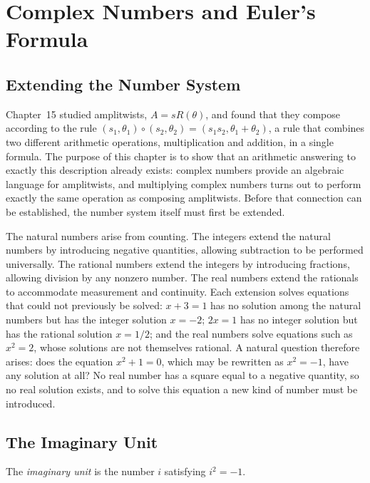 \chapter{Complex Numbers and Euler's Formula}
\label{ch:ch16-complex-euler}

\section{Extending the Number System}

Chapter~15 studied amplitwists, $A = sR(\theta)$, and found that they
compose according to the rule $(s_1,\theta_1)\circ(s_2,\theta_2) =
(s_1s_2,\theta_1+\theta_2)$, a rule that combines two different
arithmetic operations, multiplication and addition, in a single formula.
The purpose of this chapter is to show that an arithmetic answering to
exactly this description already exists: complex numbers provide an
algebraic language for amplitwists, and multiplying complex numbers turns
out to perform exactly the same operation as composing amplitwists.
Before that connection can be established, the number system itself must
first be extended.

The natural numbers arise from counting. The integers extend the natural
numbers by introducing negative quantities, allowing subtraction to be
performed universally. The rational numbers extend the integers by
introducing fractions, allowing division by any nonzero number. The real
numbers extend the rationals to accommodate measurement and continuity.
Each extension solves equations that could not previously be solved: $x+3
= 1$ has no solution among the natural numbers but has the integer
solution $x = -2$; $2x = 1$ has no integer solution but has the rational
solution $x = 1/2$; and the real numbers solve equations such as $x^2=2$,
whose solutions are not themselves rational. A natural question therefore
arises: does the equation $x^2+1=0$, which may be rewritten as $x^2=-1$,
have any solution at all? No real number has a square equal to a negative
quantity, so no real solution exists, and to solve this equation a new
kind of number must be introduced.

\section{The Imaginary Unit}

\begin{definition}
The \emph{imaginary unit} is the number $i$ satisfying $i^2 = -1$.
\end{definition}

